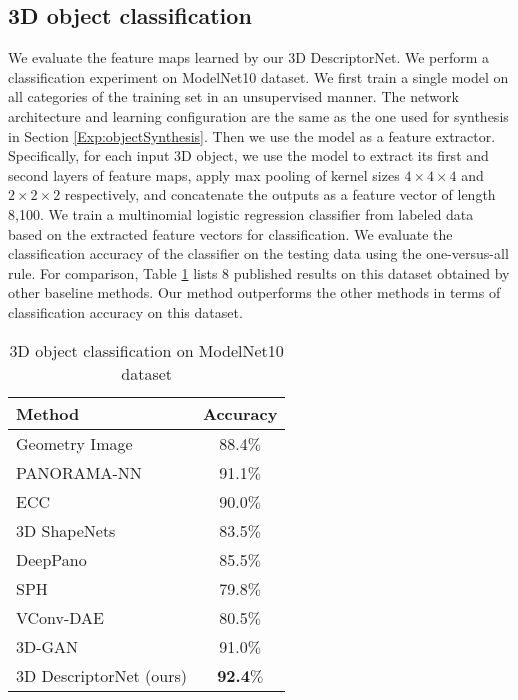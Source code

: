 \documentclass[10pt,twocolumn,letterpaper]{article}
\begin{document}
\subsection{3D object classification}

We evaluate the feature maps learned by our 3D DescriptorNet. We perform a classification experiment on ModelNet10 dataset. We first train a single model on all categories of the training set in an unsupervised manner. The network architecture and learning configuration are the same as the one used for synthesis in Section \ref{Exp:objectSynthesis}. 
Then we use the model as a feature extractor. Specifically, for each input 3D object, we use the model to extract its first and second layers of feature maps, apply max pooling of kernel sizes $4 \times 4 \times 4$ and $2 \times 2\times 2$ respectively, and concatenate the outputs as a feature vector of length 8,100. We train a multinomial logistic regression classifier from labeled data based on the extracted feature vectors for classification. We evaluate the classification accuracy of the classifier on the testing data using the one-versus-all rule. For comparison, Table \ref{exp:classification} lists 8 published results on this dataset obtained by other baseline methods. Our method outperforms the other methods in terms of classification accuracy on this dataset.
 
\begin{table}[h]
\caption{3D object classification on ModelNet10 dataset}\label{exp:classification}
\vspace{-2mm}
\centering
\begin{small}
\begin{tabular}{|l|c|}
\hline
          Method   &  Accuracy\\ \hline \hline
     Geometry Image \cite{sinha2016deep} & 88.4$\%$\\ \hline      
      
      PANORAMA-NN    \cite{sfikas2017exploiting} & 91.1$\%$ \\ \hline
    ECC  \cite{simonovsky2017dynamic} & 90.0$\%$\\ \hline    
       3D ShapeNets \cite{wu20153d}  & 83.5$\%$ \\ \hline
        DeepPano \cite{shi2015deeppano} & 85.5$\%$ \\ \hline
 SPH  \cite{kazhdan2003rotation}     & 79.8$\%$    \\ \hline
 VConv-DAE   \cite{sharma2016vconv}   & 80.5$\%$   \\ \hline
 3D-GAN  \cite{3dgan}  & 91.0$\%$  \\ \hline
  3D DescriptorNet (ours) & \textbf{92.4}$\%$\\ \hline 
\end{tabular}
\end{small}
\end{table}
\vspace{-3mm}
\end{document}
